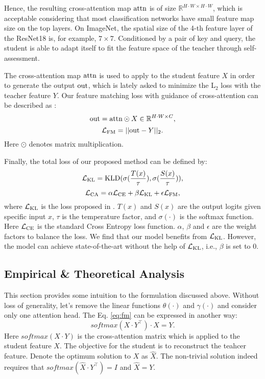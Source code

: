 \documentclass[10pt,twocolumn,letterpaper]{article}
\begin{document}
Hence, the resulting cross-attention map $\rm{attn}$ is of size $\mathbb{R}^{H\cdot W \times H\cdot W}$, which is acceptable considering that most classification networks have small feature map size on the top layers. On ImageNet, the spatial size of the 4-th feature layer of the ResNet18 is, for example, $7\times7$. 
Conditioned by a pair of key and query, the student is able to adapt itself to fit the feature space of the teacher through self-assessment.

The cross-attention map $\rm{attn}$ is used to apply to the student feature $X$ in order to generate the output $\rm{out}$, which is lately asked to minimize the L$_2$ loss with the teacher feature $Y$. Our feature matching loss with guidance of cross-attention can be described as :
\begin{equation}
    {\rm{out}}= {\rm{attn}} \odot X \in \mathbb{R}^{H\cdot W \times C},
    \label{eq:out}
\end{equation}
\begin{equation}
    \mathcal{L}_{\rm{FM}}= ||{\rm{out}}-Y||_2.
    \label{eq:fm}
\end{equation}
Here $\odot$ denotes matrix multiplication.

Finally, the total loss of our proposed method can be defined by:
\begin{equation}
    \mathcal{L}_{\rm{KL}}={\rm{KLD}}(\sigma(\frac{T(x)}{\tau}),\sigma(\frac{S(x)}{\tau})),
\end{equation}
\begin{equation}
\label{eq:objective}
    \mathcal{L}_{\rm{CA}}=\alpha\mathcal{L}_{\rm{CE}}+\beta\mathcal{L}_{\rm{KL}}+\epsilon\mathcal{L}_{\rm{FM}},
\end{equation}
where $\mathcal{L}_{\rm{KL}}$ is the loss proposed in \cite{Hinton2015DistillingTK}. $T(x)$ and $S(x)$ are the output logits given specific input $x$, $\tau$ is the temperature factor, and $\sigma(\cdot)$ is the softmax function. Here $\mathcal{L}_{\rm{CE}}$ is the standard Cross Entropy loss function.
$\alpha$, $\beta$ and $\epsilon$ are the weight factors to balance the loss. We find that our model benefits from $\mathcal{L}_{\rm{KL}}$. However, the model can achieve state-of-the-art without the help of $\mathcal{L}_{\rm{KL}}$, i.e., $\beta$ is set to 0.

\subsection{Empirical \& Theoretical Analysis}
This section provides some intuition to the formulation discussed above. Without loss of generality, let's remove the linear functions $\theta(\cdot)$ and $\gamma(\cdot)$ and consider only one attention head. The Eq. \ref{eq:fm} can be expressed in another way:
\begin{equation}
    softmax(X\cdot Y^{\top})\cdot X=Y.
\end{equation}
\noindent Here $softmax(X\cdot Y)$ is the cross-attention matrix which is applied to the student feature $X$. The objective for the student is to reconstruct the teahcer feature. Denote the optimum solution to $X$ as $\hat{X}$. The non-trivial solution indeed requires that $softmax(\hat{X}\cdot Y^{\top})=I$ and $\hat{X}=Y$.
\end{document}
